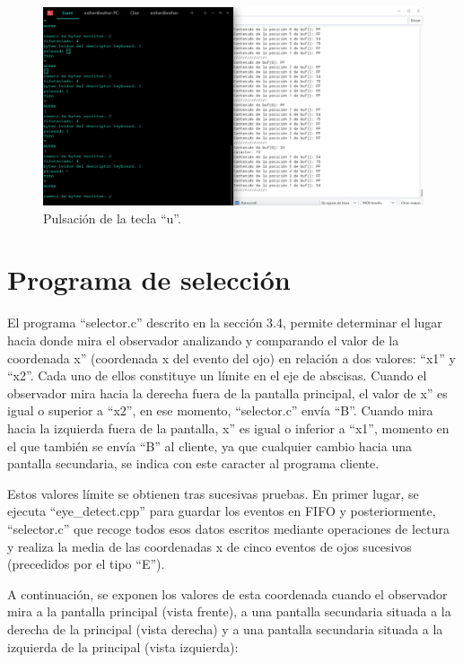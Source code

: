     \begin{figure}
    \centering
    \includegraphics[scale = 0.5]{capitulo_04/figuras_dir/teclau.jpg}
    \caption{Pulsación de la tecla ``u''.}
    \end{figure}


\section{Programa de selección} \label{s4_5}

El programa ``selector.c'' descrito en la sección 3.4, permite determinar el lugar hacia donde mira el observador analizando y comparando el valor de la coordenada x'' (coordenada x del evento del ojo) en relación a dos valores: ``x1'' y ``x2''. Cada uno de ellos constituye un límite en el eje de abscisas. Cuando el observador mira hacia la derecha fuera de la pantalla principal, el valor de x'' es igual o superior a ``x2'', en ese momento, ``selector.c'' envía ``B''. Cuando mira hacia la izquierda fuera de la pantalla, x'' es igual o inferior a ``x1'', momento en el que también se envía ``B'' al cliente, ya que cualquier cambio hacia una pantalla secundaria, se indica con este caracter al programa cliente. 

Estos valores límite se obtienen tras sucesivas pruebas. En primer lugar, se ejecuta ``eye\_detect.cpp'' para guardar los eventos en FIFO y posteriormente, ``selector.c'' que recoge todos esos datos escritos mediante operaciones de lectura y realiza la media de las coordenadas x de cinco eventos de ojos sucesivos (precedidos por el tipo ``E'').

A continuación, se exponen los valores de esta coordenada cuando el observador mira a la pantalla principal (vista frente), a una pantalla secundaria situada a la derecha de la principal (vista derecha) y a una pantalla secundaria situada a la izquierda de la principal (vista izquierda):


